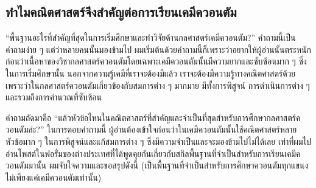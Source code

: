 \subsection{ทำไมคณิตศาสตร์จึงสำคัญต่อการเรียนเคมีควอนตัม}

\enquote{พื้นฐานอะไรที่สำคัญที่สุดในการเริ่มศึกษาและทำวิจัยด้านกลศาสตร์เคมีควอนตัม?} คำถามนี้เป็นคำถามง่าย ๆ แต่ว่าหลายคนนั้นมองข้ามไป
ผมเริ่มต้นด้วยคำถามนี้ก็เพราะว่าอยากให้ผู้อ่านนั้นตระหนักก่อนว่าเนื้อหาของวิชากลศาสตร์ควอนตัมโดยเฉพาะเคมีควอนตัมนั้นมีความยากและซับซ้อนมาก ๆ
ซึ่งในการเริ่มศึกษานั้น นอกจากความรู้เคมีที่เราจะต้องมีแล้ว เราจะต้องมีความรู้ทางคณิตศาสตร์ด้วย เพราะว่าในกลศาสตร์ควอนตัมเกี่ยวข้องกับสมการต่าง ๆ
มากมาย มีทั้งการพิสูจน์ การดำเนินการต่าง ๆ และรวมถึงการคำนวณที่ซับซ้อน

คำถามถัดมาคือ \enquote{แล้วหัวข้อไหนในคณิตศาสตร์ที่สำคัญและจำเป็นที่สุดสำหรับการศึกษากลศาสตร์ควอนตัมล่ะ?} ในการตอบคำถามนี้
ผู้อ่านต้องเข้าใจก่อนว่าในเคมีควอนตัมนั้นใช้คณิตศาสตร์หลายหัวข้อมาก ๆ ในการพิสูจน์และแก้สมการต่าง ๆ ซึ่งมีความจำเป็นและจะมองข้ามไปไม่ได้เลย
เท่าที่ผมไปอ่านโพสต์ในฟอรั่มของต่างประเทศที่ได้พูดคุยกันเกี่ยวกับสกิลพื้นฐานที่จำเป็นสำหรับการเรียนเคมีควอนตัมมานั้น ผมจับใจความและขอสรุปดังนี้
(เป็นพื้นฐานที่จำเป็นสำหรับการศึกษาควอนตัมทุกแขนง ไม่เพียงแค่เคมีควอนตัมเท่านั้น)


